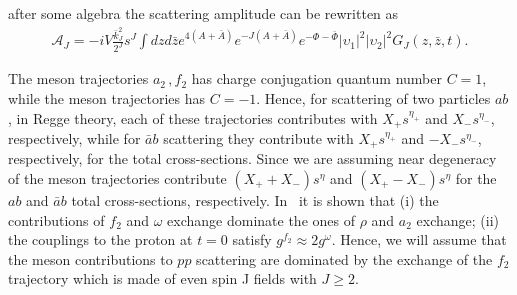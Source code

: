 \documentclass[a4paper,12pt]{article}
\begin{document}
after some algebra the scattering amplitude can be rewritten as
\begin{align}
\mathcal{A}_J = - i V \frac{\bar{k}_J^2}{2^J} s^J \int dz d\bar{z} e^{4\left(A+\bar{A}\right)} e^{-J\left(A+\bar{A}\right)} e^{-\Phi - \bar{\Phi}} {|\upsilon_1|}^2 {|\upsilon_2|}^2  G_J \left(z, \bar{z}, t\right).
\end{align}

The meson trajectories $a_2 \, , f_2$ has charge conjugation quantum number $C = 1$, while the meson trajectories has $C = -1 $. Hence, for scattering of two particles $ab$, in Regge theory, each of these trajectories contributes with $X_{+} s^{\eta_+}$ and $X_{-}s^{\eta_-}$, respectively, while for $\bar{a}b$ scattering they contribute with $X_{+} s^{\eta_+}$ and $-X_{-}s^{\eta_-}$, respectively, for the total cross-sections. Since we are assuming near degeneracy of the meson trajectories contribute $\left(X_{+} + X_{-}\right) s^{\eta}$ and $\left(X_{+} - X_{-}\right) s^{\eta}$ for the $ab$ and $\bar{a}b$ total cross-sections, respectively. In~\cite{donnachie_dosch_landshoff_nachtmann_2002} it is shown that (i) the contributions of $f_2$ and $\omega$ exchange dominate the ones of $\rho$ and $a_2$ exchange; (ii) the couplings to the proton at $t = 0$ satisfy $g^{f_2} \approx 2 g^{\omega}$. Hence, we will assume that the meson contributions to $pp$ scattering are dominated by the exchange of the $f_2$ trajectory which is made of even spin J fields with $J \geqslant 2$.
\end{document}
